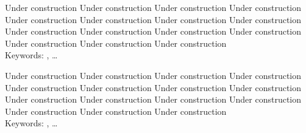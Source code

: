 \documentclass[
11pt, %
english, %
singlespacing, %
headsepline, %
]{MastersDoctoralThesis} %
\begin{document}





%

Under construction Under construction Under construction Under construction Under construction
Under construction Under construction Under construction Under construction Under construction
Under construction Under construction Under construction Under construction Under construction 
\\

Keywords: \keywordnames, \ldots



%

Under construction Under construction Under construction Under construction Under construction
Under construction Under construction Under construction Under construction Under construction
Under construction Under construction Under construction Under construction Under construction 
\\

Keywords: \keywordnames, \ldots %




\end{document}
